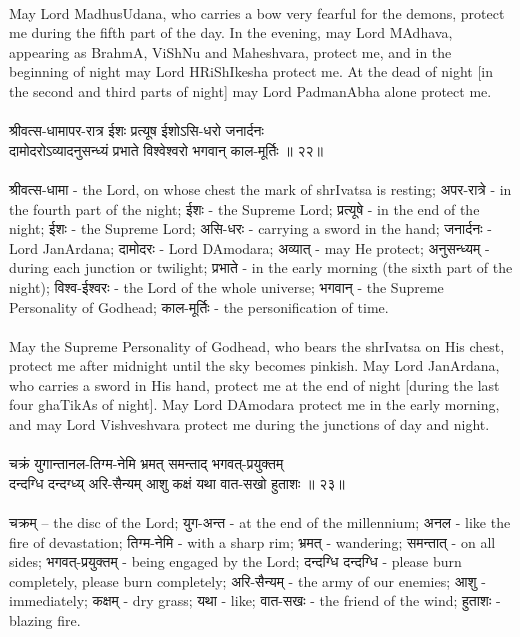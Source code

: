 \\
May Lord MadhusUdana, who carries a bow very fearful for the demons, protect me during the fifth part of the day. In the evening, may Lord MAdhava, appearing as BrahmA, ViShNu and Maheshvara, protect me, and in the beginning of night may Lord HRiShIkesha protect me. At the dead of night [in the second and third parts of night] may Lord PadmanAbha alone protect me.\\
\\
श्रीवत्स-धामापर-रात्र ईशः प्रत्यूष ईशोऽसि-धरो जनार्दनः\\
दामोदरोऽव्यादनुसन्ध्यं प्रभाते विश्वेश्वरो भगवान् काल-मूर्तिः ॥ २२॥\\
\\
श्रीवत्स-धामा - the Lord, on whose chest the mark of shrIvatsa is resting;  अपर-रात्रे - in the fourth part of the night;  ईशः - the Supreme Lord;  प्रत्यूषे - in the end of the night;  ईशः - the Supreme Lord;  असि-धरः -  carrying a sword in the hand;  जनार्दनः - Lord JanArdana;  दामोदरः - Lord DAmodara;  अव्यात् - may He protect;  अनुसन्ध्यम् - during each junction or twilight;  प्रभाते - in the early morning (the sixth part of the night);  विश्व-ईश्वरः - the Lord of the whole universe; भगवान् - the Supreme Personality of Godhead;  काल-मूर्तिः - the personification of time.\\
\\
May the Supreme Personality of Godhead, who bears the shrIvatsa on His chest, protect me after midnight until the sky becomes pinkish. May Lord JanArdana, who carries a sword in His hand, protect me at the end of night [during the last four ghaTikAs of night]. May Lord DAmodara protect me in the early morning, and may Lord Vishveshvara protect me during the junctions of day and night.\\
\\
चक्रं युगान्तानल-तिग्म-नेमि भ्रमत् समन्ताद् भगवत्-प्रयुक्तम्\\
दन्दग्धि दन्दग्ध्य् अरि-सैन्यम् आशु कक्षं यथा वात-सखो हुताशः ॥ २३॥\\
\\
चक्रम् – the disc of the Lord;  युग-अन्त - at the end of the millennium;  अनल -  like the fire of devastation;  तिग्म-नेमि - with a sharp rim; भ्रमत् - wandering;  समन्तात् - on all sides;  भगवत्-प्रयुक्तम् - being engaged by the Lord;  दन्दग्धि दन्दग्धि - please burn completely, please burn completely;  अरि-सैन्यम् - the army of our enemies;  आशु - immediately;  कक्षम् - dry grass;  यथा - like;  वात-सखः - the friend of the wind;  हुताशः - blazing fire.\\
